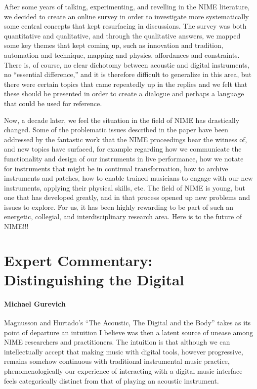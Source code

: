 After some years of talking, experimenting, and revelling in the NIME literature, we decided to create an online survey in order to investigate more systematically some central concepts that kept resurfacing in discussions. The survey was both quantitative and qualitative, and through the qualitative answers, we mapped some key themes that kept coming up, such as innovation and tradition, automation and technique, mapping and physics, affordances and constraints. There is, of course, no clear dichotomy between acoustic and digital instruments, no ``essential difference,'' and it is therefore difficult to generalize in this area, but there were certain topics that came repeatedly up in the replies and we felt that these should be presented in order to create a dialogue and perhaps a language that could be used for reference. 

Now, a decade later, we feel the situation in the field of NIME has drastically changed. Some of the problematic issues described in the paper have been addressed by the fantastic work that the NIME proceedings bear the witness of, and new topics have surfaced, for example regarding how we communicate the functionality and design of our instruments in live performance, how we notate for instruments that might be in continual transformation, how to archive instruments and patches, how to enable trained musicians to engage with our new instruments, applying their physical skills, etc. The field of NIME is young, but one that has developed greatly, and in that process opened up new problems and issues to explore. For us, it has been highly rewarding to be part of such an energetic, collegial, and interdisciplinary research area. Here is to the future of NIME!!!

\section*{Expert Commentary: Distinguishing the Digital}
\paragraph{Michael Gurevich}

Magnusson and Hurtado's ``The Acoustic, The Digital and the Body'' takes as its point of departure an intuition I believe was then a latent source of unease among NIME researchers and practitioners. The intuition is that although we can intellectually accept that making music with digital tools, however progressive, remains somehow continuous with traditional instrumental music practice, phenomenologically our experience of interacting with a digital music interface feels categorically distinct from that of playing an acoustic instrument. 

